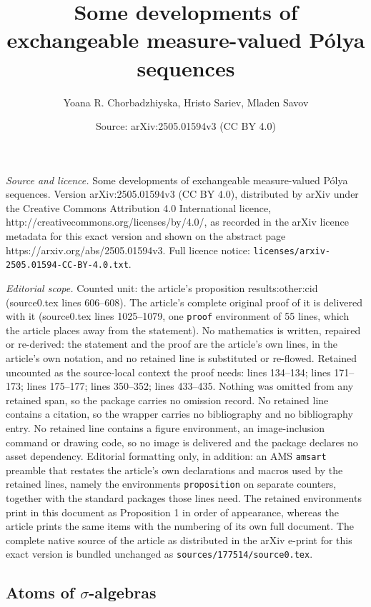 \documentclass[10pt,a4paper]{amsart}
\title{Some developments of exchangeable measure-valued P\'{o}lya sequences}
\author{Yoana R. Chorbadzhiyska, Hristo Sariev, Mladen Savov}
\date{Source: arXiv:2505.01594v3 (CC BY 4.0)}
\begin{document}
\maketitle

\noindent\emph{Source and licence.} Some developments of exchangeable measure-valued P\'{o}lya sequences. Version arXiv:2505.01594v3 (CC BY 4.0), distributed by arXiv under the Creative Commons Attribution 4.0 International licence, http://creativecommons.org/licenses/by/4.0/, as recorded in the arXiv licence metadata for this exact version and shown on the abstract page https://arxiv.org/abs/2505.01594v3. Full licence notice: \texttt{licenses/arxiv-2505.01594-CC-BY-4.0.txt}.\par\smallskip

\noindent\textit{Editorial scope.} Counted unit: the article's proposition results:other:cid (source0.tex lines 606--608). The article's complete original proof of it is delivered with it (source0.tex lines 1025--1079, one \texttt{proof} environment of 55 lines, which the article places away from the statement). No mathematics is written, repaired or re-derived: the statement and the proof are the article's own lines, in the article's own notation, and no retained line is substituted or re-flowed.  Retained uncounted as the source-local context the proof needs: lines 134--134; lines 171--173; lines 175--177; lines 350--352; lines 433--435.  Nothing was omitted from any retained span, so the package carries no omission record.  No retained line contains a citation, so the wrapper carries no bibliography and no bibliography entry.  No retained line contains a figure environment, an image-inclusion command or drawing code, so no image is delivered and the package declares no asset dependency.  Editorial formatting only, in addition: an AMS \texttt{amsart} preamble that restates the article's own declarations and macros used by the retained lines, namely the environments \texttt{proposition} on separate counters, together with the standard packages those lines need.  The retained environments print in this document as Proposition 1 in order of appearance, whereas the article prints the same items with the numbering of its own full document.  The complete native source of the article as distributed in the arXiv e-print for this exact version is bundled unchanged as \texttt{sources/177514/source0.tex}.
\subsection{Atoms of $\sigma$-algebras}\label{section:model:atoms}
\end{document}
